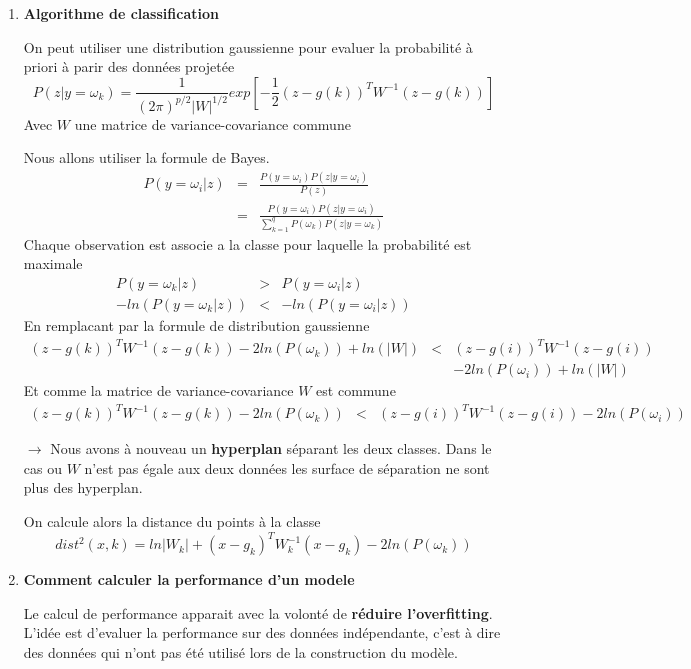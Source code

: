 \documentclass[a4paper, 11pt, onecolumn]{article}
\begin{document}
\begin{enumerate}
\item \textbf{Algorithme de classification}

On peut utiliser une distribution gaussienne pour evaluer la probabilité à priori à parir des données projetée
$$P(z|y=\omega_k) = \frac{1}{(2\pi)^{p/2}|W|^{1/2}}exp[-\frac{1}{2}(z-g(k))^TW^{-1}(z-g(k))]$$
Avec $W$ une matrice de variance-covariance commune


\begin{framed}
Nous allons utiliser la formule de Bayes.
\begin{eqnarray}
P(y=\omega_i|z) &=& \frac{P(y=\omega_i)P(z|y=\omega_i)}{P(z)}\\
&=& \frac{P(y=\omega_i)P(z|y=\omega_i)}{\sum_{k=1}^qP(\omega_k)P(z|y=\omega_k)}
\end{eqnarray}
Chaque observation est associe a la classe pour laquelle la probabilité est maximale
\begin{eqnarray}
P(y=\omega_k|z)&>&P(y=\omega_i|z)\\
-ln(P(y=\omega_k|z)) &<& -ln(P(y=\omega_i|z))
\end{eqnarray}
En remplacant par la formule de distribution gaussienne
\begin{eqnarray}
(z-g(k))^TW^{-1}(z-g(k))-2ln(P(\omega_k))+ln(|W|)&<&(z-g(i))^TW^{-1}(z-g(i))\\
&&-2ln(P(\omega_i))+ln(|W|)
\end{eqnarray}
Et comme la matrice de variance-covariance $W$ est commune
\begin{eqnarray}
(z-g(k))^TW^{-1}(z-g(k))-2ln(P(\omega_k))&<&(z-g(i))^TW^{-1}(z-g(i))-2ln(P(\omega_i))
\end{eqnarray}
\end{framed}

$\rightarrow$ Nous avons à nouveau un \textbf{hyperplan} séparant les deux classes.
Dans le cas ou $W$ n'est pas égale aux deux données les surface de séparation ne sont plus des hyperplan. 

On calcule alors la distance du points à la classe
$$dist^2(x,k)=ln|W_k| + (x-g_k)^TW_k^{-1}(x-g_k)-2ln(P(\omega_k))$$

\item \textbf{Comment calculer la performance d'un modele}

  Le calcul de performance apparait avec la volonté de \textbf{réduire l'overfitting}. L'idée est d'evaluer la performance sur des données indépendante, c'est à dire des données qui n'ont pas été utilisé lors de la construction du modèle.


\end{enumerate}
\end{document}
